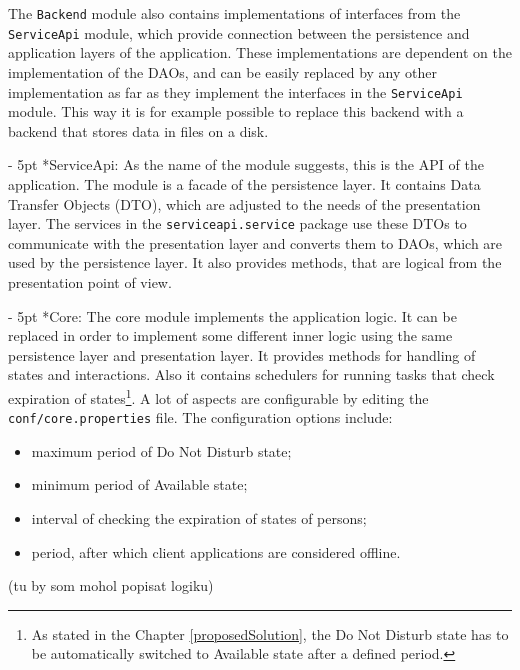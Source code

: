 \documentclass[11pt,singleside]{myfithesis2}
\makeatletter
\renewcommand\paragraph{
   \vspace{-10pt}
   \@startsection{paragraph}{4}{0mm}
      {\baselineskip}
      {- 5pt}
      {\normalfont\normalsize\bfseries}
}
\makeatother
\begin{document}
The \texttt{Backend} module also contains implementations of interfaces from the \texttt{ServiceApi} module, which provide connection between the persistence and application layers of the application. These implementations are dependent on the implementation of the DAOs, and can be easily replaced by any other implementation as far as they implement the interfaces in the \texttt{ServiceApi} module. This way it is for example possible to replace this backend with a backend that stores data in files on a disk.

\paragraph*{ServiceApi: } As the name of the module suggests, this is the API of the application. The module is a facade of the persistence layer. It contains Data Transfer Objects (DTO), which are adjusted to the needs of the presentation layer. The services in the \texttt{serviceapi.service} package use these DTOs to communicate with the presentation layer and converts them to DAOs, which are used by the persistence layer. It also provides methods, that are logical from the presentation point of view.

\paragraph*{Core: } The core module implements the application logic. It can be replaced in order to implement some different inner logic using the same persistence layer and presentation layer. It provides methods for handling of states and interactions. Also it contains schedulers for running tasks that check expiration of states\footnote{As stated in the Chapter \ref{proposedSolution}, the Do Not Disturb state has to be automatically switched to Available state after a defined period.}. A lot of aspects are configurable by editing the \texttt{conf/core.properties} file. The configuration options include:
\begin{itemize}
	\item maximum period of Do Not Disturb state;
	\item minimum period of Available state;
	\item interval of checking the expiration of states of persons;
	\item period, after which client applications are considered offline.
\end{itemize}
(tu by som mohol popisat logiku)
\end{document}
